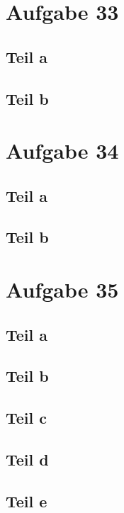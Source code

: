 \documentclass[10pt,a4paper]{article}
\begin{document}
\section{Aufgabe 33}

\subsection{Teil a}

\subsection{Teil b}

\section{Aufgabe 34}

\subsection{Teil a}

\subsection{Teil b}

\section{Aufgabe 35}

\subsection{Teil a}

\subsection{Teil b}

\subsection{Teil c}

\subsection{Teil d}

\subsection{Teil e}
\end{document}
